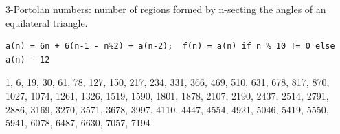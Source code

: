 3-Portolan numbers: number of regions formed by n-secting the angles of an equilateral triangle.
\begin{verbatim}
a(n) = 6n + 6(n-1 - n%2) + a(n-2);  f(n) = a(n) if n % 10 != 0 else a(n) - 12
\end{verbatim}
1, 6, 19, 30, 61, 78, 127, 150, 217, 234, 331, 366, 469, 510, 631, 678, 817, 870, 1027, 1074, 1261, 1326, 1519, 1590, 1801, 1878, 2107, 2190, 2437, 2514, 2791, 2886, 3169, 3270, 3571, 3678, 3997, 4110, 4447, 4554, 4921, 5046, 5419, 5550, 5941, 6078, 6487, 6630, 7057, 7194
